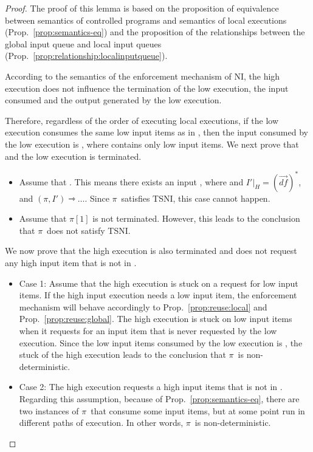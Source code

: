 \documentclass[10pt,a4paper,oneside]{article}
\def\executionnt#1#2{\ensuremath{(#1, #2) \rightarrowtriangle \dots}}
\def\defseq#1{\ensuremath{#1 = (\defvec)^*}}
\def\defvec{\ensuremath{\vec{df}}}
\def\Prog{\ensuremath{\pi}}
\def\Progl#1{\ensuremath{\Prog[#1]}}
\begin{document}
\begin{proof}
The proof of this lemma is based on the proposition of equivalence between semantics of controlled programs and semantics of local executions (Prop.~\ref{prop:semantics-eq}) and the proposition of the relationships between the global input queue and local input queues (Prop.~\ref{prop:relationship:localinputqueue}).

According to the semantics of the enforcement mechanism of NI, the high execution does not influence the termination of the low execution, the input consumed and the output generated by the low execution.

Therefore, regardless of the order of executing local executions, if the low execution consumes the same low input items as in , then the input consumed by the low execution is , where  contains only low input items. We next prove that  and the low execution is terminated.

\begin{itemize}
\item Assume that . This means there exists an input , where  and \defseq{I'|_H}, and \executionnt{\Prog}{I'}. Since \Prog\ satisfies TSNI, this case cannot happen.

\item Assume that \Progl{1} is not terminated. However, this leads to the conclusion that \Prog\ does not satisfy TSNI.
\end{itemize}

We now prove that the high execution is also terminated and does not request any high input item that is not in . \begin{itemize}
    \item Case 1: Assume that the high execution is stuck on a request for low input items. If the high input execution needs a low input item, the enforcement mechanism will behave accordingly to Prop.~\ref{prop:reuse:local} and Prop.~\ref{prop:reuse:global}. The high execution is stuck on low input items when it requests for an input item that is never requested by the low execution. Since the low input items consumed by the low execution is , the stuck of the high execution leads to the conclusion that \Prog\ is non-deterministic.

	\item Case 2: The high execution requests a high input items that is not in . Regarding this assumption, because of Prop.~\ref{prop:semantics-eq}, there are two instances of \Prog\ that consume some input items, but at some point run in different paths of execution. In other words, \Prog\ is non-deterministic.


\end{itemize}
\end{proof}
\end{document}
